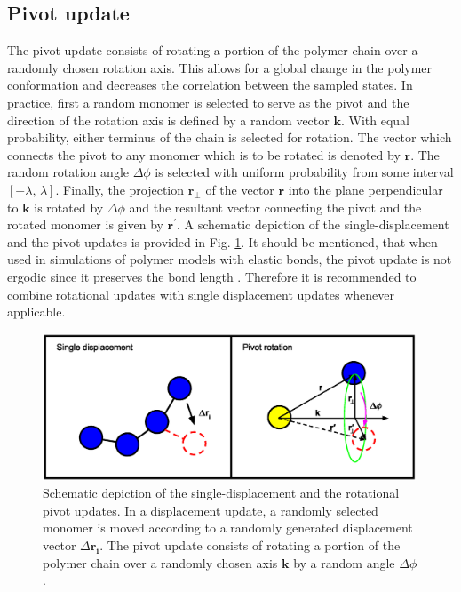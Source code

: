 \documentclass[12pt]{report}
\begin{document}
\subsection{Pivot update}
The pivot update consists of rotating a portion of the polymer chain over a randomly chosen rotation axis. This allows for a global change in the polymer conformation and decreases the correlation between the sampled states. In practice, first a random monomer is selected to serve as the pivot and the direction of the rotation axis is defined by a random vector $\mathbf{k}$. With equal probability, either terminus of the chain is selected for rotation. The vector which connects the pivot to any monomer which is to be rotated is denoted by $\mathbf{r}$. The random rotation angle $\Delta \phi$ is selected with uniform probability from some interval $[-\lambda,\,\lambda]$. Finally, the projection $\mathbf{r}_{\bot}$ of the vector $\mathbf{r}$ into the plane perpendicular to $\mathbf{k}$ is rotated by $\Delta \phi$ and the resultant vector connecting the pivot and the rotated monomer is given by $\mathbf{r}^{\prime}$. A schematic depiction of the single-displacement and the pivot updates is provided in Fig. \ref{fig:conformUpdate}. It should be mentioned, that when used in simulations of polymer models with elastic bonds, the pivot update is not ergodic since it preserves the bond length \cite{Bachmann2014}. Therefore it is recommended to combine rotational updates with single displacement updates whenever applicable. 

%
\begin{figure}
\center
\includegraphics[width = 0.99\textwidth]{chapter3Figs/conformationalUpdates.eps}
\caption{\label{fig:conformUpdate}%
Schematic depiction of the single-displacement and the rotational pivot updates.
In a displacement update, a randomly selected monomer is moved according to a randomly generated displacement vector $\Delta \mathbf{r_{i}}$. The pivot update consists of rotating a portion of the polymer chain over a randomly chosen axis $\mathbf{k}$ by a random angle $\Delta \phi$. 
}
\end{figure}
% 
\end{document}
